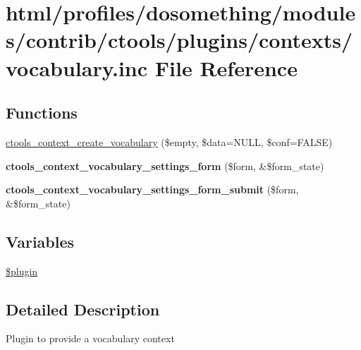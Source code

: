 \hypertarget{vocabulary_8inc}{
\section{html/profiles/dosomething/modules/contrib/ctools/plugins/contexts/vocabulary.inc File Reference}
\label{vocabulary_8inc}
}
\subsection*{Functions}
\begin{DoxyCompactItemize}
\item 
\hyperlink{vocabulary_8inc_ae43e953ad5b23f153266d758a4cee903}{ctools\_\-context\_\-create\_\-vocabulary} (\$empty, \$data=NULL, \$conf=FALSE)
\item 
\hypertarget{vocabulary_8inc_a66899208c907f5dd825e2d4f04d143ee}{
{\bfseries ctools\_\-context\_\-vocabulary\_\-settings\_\-form} (\$form, \&\$form\_\-state)}
\label{vocabulary_8inc_a66899208c907f5dd825e2d4f04d143ee}

\item 
\hypertarget{vocabulary_8inc_aceba4de05b09cb55002302d560de5e1e}{
{\bfseries ctools\_\-context\_\-vocabulary\_\-settings\_\-form\_\-submit} (\$form, \&\$form\_\-state)}
\label{vocabulary_8inc_aceba4de05b09cb55002302d560de5e1e}

\end{DoxyCompactItemize}
\subsection*{Variables}
\begin{DoxyCompactItemize}
\item 
\hyperlink{vocabulary_8inc_ada8a7130088351710bb02ed622d6bf65}{\$plugin}
\end{DoxyCompactItemize}


\subsection{Detailed Description}
Plugin to provide a vocabulary context 

